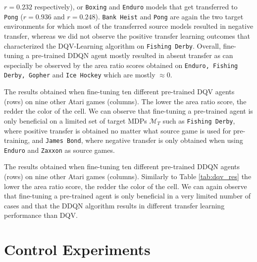 $r=0.232$ respectively), or \texttt{Boxing} and \texttt{Enduro} models that get transferred to \texttt{Pong} ($r=0.936$ and $r=0.248$). \texttt{Bank Heist} and \texttt{Pong} are again the two target environments for which most of the transferred source models resulted in negative transfer, whereas we did not observe the positive transfer learning outcomes that characterized the DQV-Learning algorithm on \texttt{Fishing Derby}. Overall, fine-tuning a pre-trained DDQN agent mostly resulted in absent transfer as can especially be observed by the area ratio scores obtained on \texttt{Enduro, Fishing Derby, Gopher} and \texttt{Ice Hockey} which are mostly $\approx 0$.  

\begin{table}[ht!]
	\caption{The results obtained when fine-tuning ten different pre-trained DQV agents (rows) on nine other Atari games (columns). The lower the area ratio score, the redder the color of the cell. We can observe that fine-tuning a pre-trained agent is only beneficial on a limited set of target MDPs $\mathcal{M}_T$ such as \texttt{Fishing Derby}, where positive transfer is obtained no matter what source game is used for pre-training, and \texttt{James Bond}, where negative transfer is only obtained when using \texttt{Enduro} and \texttt{Zaxxon} as source games.}
	
	\label{tab:dqv_res}
\end{table}


\begin{table}[ht!]
	\caption{The results obtained when fine-tuning ten different pre-trained DDQN agents (rows) on nine other Atari games (columns). Similarly to Table \ref{tab:dqv_res} the lower the area ratio score, the redder the color of the cell. We can again observe that fine-tuning a pre-trained agent is only beneficial in a very limited number of cases and that the DDQN algorithm results in different transfer learning performance than DQV.}
	
	\label{tab:ddqn_res}
\end{table}


\section{Control Experiments}

